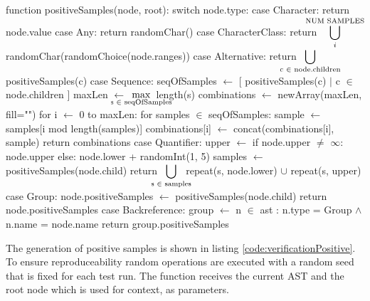 \begin{pseudoCode}[title={Generating Positive Test Samples},breakable=true,label=code:verificationPositive]
function positiveSamples(node, root):
  switch node.type:
    case Character: %
      return { node.value }
    case Any:
      return { randomChar() } %
    case CharacterClass: %
      return ${\displaystyle \hspace{-1.5em}\bigcup_{i}^\text{NUM SAMPLES}}\hspace{-1.5em}$ randomChar(randomChoice(node.ranges)) %
    case Alternative: %
      return ${\displaystyle \hspace{-2em}\bigcup_{\text{c }\in\text{ node.children}}\hspace{-2em}}$ positiveSamples(c) %
    case Sequence:  %
      seqOfSamples $\gets$ [ positiveSamples(c) $\mid$ c $\in$ node.children ]
      maxLen $\gets$ ${\displaystyle \hspace{-2em}\max_{\text{s } \in \text{ seqOfSamples}}}\hspace{-2em}$  length(s)
      combinations $\gets$ newArray(maxLen, fill="")
      for i $\gets$ 0 to maxLen:
        for samples $\in$ seqOfSamples:
          sample $\gets$ samples[i mod length(samples)]
          combinations[i] $\gets$ concat(combinations[i], sample)
      return combinations %
    case Quantifier: %
      upper $\gets$ if node.upper $\neq$ $\infty$:
                 node.upper 
               else: node.lower + randomInt(1, 5) 
      samples $\gets$ positiveSamples(node.child)
      return ${\displaystyle \hspace{-1em}\bigcup_{\text{s }\in\text{ samples}}\hspace{-1em}}$ repeat(s, node.lower) $\cup$ repeat(s, upper)  %
    case Group: %
        node.positiveSamples $\gets$ positiveSamples(node.child)        
        return node.positiveSamples
    case Backreference:
      group $\gets$ n $\in$ ast : n.type = Group $\land$ n.name = node.name
      return group.positiveSamples %
\end{pseudoCode}

The generation of positive samples is shown in listing \ref{code:verificationPositive}. To ensure reproduceability random operations are executed with a random seed that is fixed for each test run. The function receives the current AST  and the root  node which is used for context, as parameters.

